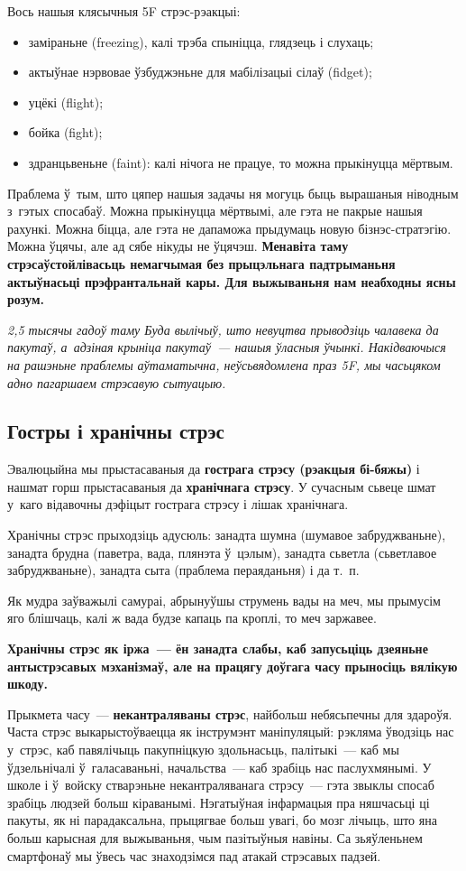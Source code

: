 Вось нашыя клясычныя 5F стрэс-рэакцыі: 
\begin{itemize}
  \item заміраньне (freezing), калі трэба спыніцца, глядзець і слухаць;
  \item актыўнае нэрвовае ўзбуджэньне для мабілізацыі сілаў (fidget);
  \item уцёкі (flight);
  \item бойка (fight);
  \item здранцьвеньне (faint): калі нічога не працуе, то можна прыкінуцца мёртвым.
\end{itemize}

Праблема ў~тым, што цяпер нашыя задачы ня могуць быць вырашаныя ніводным з~гэтых спосабаў. Можна прыкінуцца мёртвымі, але гэта не пакрые нашыя рахункі. Можна біцца, але гэта не дапаможа прыдумаць новую бізнэс-стратэгію. Можна ўцячы, але ад сябе нікуды не ўцячэш. \textbf{Менавіта таму стрэсаўстойлівасьць немагчымая без прыцэльнага падтрыманьня актыўнасьці прэфрантальнай кары. Для выжываньня нам неабходны ясны розум.}

\emph{2,5 тысячы гадоў таму Буда вылічыў, што невуцтва прыводзіць чалавека да пакутаў, а~адзіная крыніца пакутаў~--- нашыя ўласныя ўчынкі. Накідваючыся на рашэньне праблемы аўтаматычна, неўсьвядомлена праз 5F, мы часьцяком адно пагаршаем стрэсавую сытуацыю.}

\subsection*{Гостры і хранічны стрэс}

Эвалюцыйна мы прыстасаваныя да \textbf{гострага стрэсу (рэакцыя бі-бяжы)} і нашмат горш прыстасаваныя да \textbf{хранічнага стрэсу}. У сучасным сьвеце шмат у~каго відавочны дэфіцыт гострага стрэсу і лішак хранічнага. 

Хранічны стрэс прыходзіць адусюль: занадта шумна (шумавое забруджваньне), занадта брудна (паветра, вада, плянэта ў~цэлым), занадта сьветла (сьветлавое забруджваньне), занадта сыта (праблема пераяданьня) і да т.~п.

Як мудра заўважылі самураі, абрынуўшы струмень вады на меч, мы прымусім яго блішчаць, калі ж вада будзе капаць па кроплі, то меч заржавее. 

\textbf{Хранічны стрэс як іржа~--- ён занадта слабы, каб запусьціць дзеяньне антыстрэсавых мэханізмаў, але на працягу доўгага часу прыносіць вялікую шкоду.}

Прыкмета часу~--- \textbf{некантраляваны стрэс}, найбольш небясьпечны для здароўя. Часта стрэс выкарыстоўваецца як інструмэнт маніпуляцый: рэкляма ўводзіць нас у~стрэс, каб павялічыць пакупніцкую здольнасьць, палітыкі~--- каб мы ўдзельнічалі ў~галасаваньні, начальства~--- каб зрабіць нас паслухмянымі. У школе і ў~войску стварэньне некантраляванага стрэсу~--- гэта звыклы спосаб зрабіць людзей больш кіраванымі. Нэгатыўная інфармацыя пра няшчасьці ці пакуты, як ні парадаксальна, прыцягвае больш увагі, бо мозг лічыць, што яна больш карысная для выжываньня, чым пазітыўныя навіны. Са зьяўленьнем смартфонаў мы ўвесь час знаходзімся пад атакай стрэсавых падзей.

